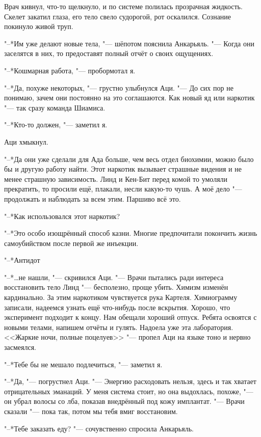 \documentclass[a4paper,10pt]{book}
\newcommand{\ldotst}{\so{...}\xspace}
\newcommand{\ldotsq}{\so{?\hbox{\hspace{-.212em}}..}\xspace}
\begin{document}
Врач кивнул, что-то щелкнуло, и по системе полилась прозрачная жидкость. Скелет 
закатил глаза, его тело свело судорогой, рот оскалился. Сознание покинуло живой 
труп.

"--*Им уже делают новые тела, "--- шёпотом пояснила Анкарьяль. "--- Когда они 
заселятся в них, то предоставят полный отчёт о своих ощущениях.

"--*Кошмарная работа, "--- пробормотал я.

"--*Да, похуже некоторых, "--- грустно улыбнулся Аци. "--- До сих пор не 
понимаю, 
зачем они постоянно на это соглашаются. Как новый яд или наркотик "--- так 
сразу 
команда Шиамиса. 

"--*Кто-то должен, "--- заметил я.

Аци хмыкнул.

"--*Да они уже сделали для Ада больше, чем весь отдел биохимии, можно было бы и 
другую работу найти. Этот наркотик вызывает страшные видения и не менее 
страшную зависимость. Линд и Кен-Бит перед комой то умоляли прекратить, то 
просили ещё, плакали, несли какую-то чушь. А моё дело "--- продолжать и 
наблюдать за всем этим. Паршиво всё это.

"--*Как использовался этот наркотик?

"--*Это особо изощрённый способ казни. Многие предпочитали покончить жизнь 
самоубийством после первой же инъекции.

"--*Антидот\ldotsq

"--*\ldots не нашли, "--- скривился Аци. "--- Врачи пытались ради интереса 
восстановить тело Линд "--- бесполезно, проще убить. Химизм изменён 
кардинально. 
За этим наркотиком чувствуется рука Картеля. Химиограмму записали, надеемся 
узнать ещё что-нибудь после вскрытия. Хорошо, что эксперимент подходит к концу. 
Нам обещали хороший отпуск. Ребята освоятся с новыми телами, напишем отчёты и 
гулять. Надоела уже эта лаборатория. <<Жаркие ночи, полные поцелуев\ldotst>> 
"--- 
пропел Аци на языке тоно и нервно засмеялся.

"--*Тебе бы не мешало подлечиться, "--- заметил я.

"--*Да, "--- погрустнел Аци. "--- Энергию расходовать нельзя, здесь и так 
хватает 
отрицательных эманаций. У меня система стоит, но она выдохлась, похоже, "--- он 
убрал волосы со лба, показав внедрённый под кожу имплантат. "--- Врачи сказали 
"--- пока так, потом мы тебя вмиг восстановим.

"--*Тебе заказать еду? "--- сочувственно спросила Анкарьяль.
\end{document}

